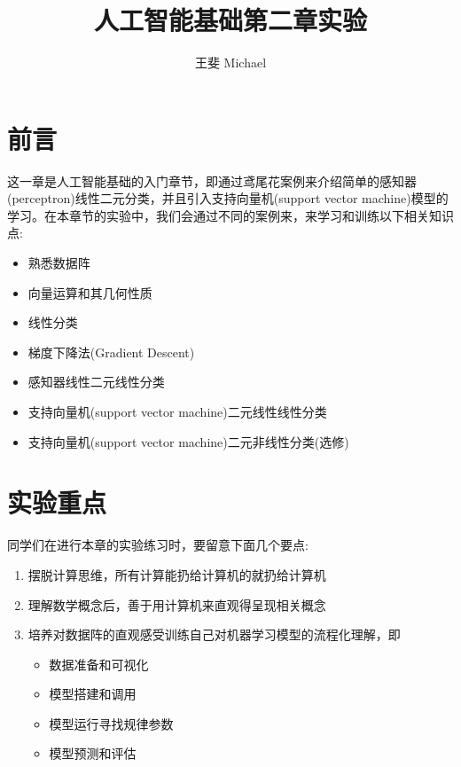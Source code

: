 \documentclass[11pt]{article}
\theoremstyle{definition}
\numberwithin{equation}{section}
\begin{document}


\title{人工智能基础第二章实验}
\author{王斐 Michael}
\date{}

\maketitle

\section*{前言}

这一章是人工智能基础的入门章节，即通过鸢尾花案例来介绍简单的感知器(perceptron)线性二元分类，并且引入支持向量机(support vector machine)模型的学习。在本章节的实验中，我们会通过不同的案例来，来学习和训练以下相关知识点:
\begin{itemize}
	\item 熟悉数据阵
	\item 向量运算和其几何性质
	\item 线性分类
	\item 梯度下降法(Gradient Descent)
	\item 感知器线性二元线性分类
	\item 支持向量机(support vector machine)二元线性线性分类
	\item 支持向量机(support vector machine)二元非线性分类(选修)
\end{itemize}

\section*{实验重点}

同学们在进行本章的实验练习时，要留意下面几个要点:
\begin{enumerate}
	\item 摆脱计算思维，所有计算能扔给计算机的就扔给计算机
	\item 理解数学概念后，善于用计算机来直观得呈现相关概念
	\item 培养对数据阵的直观感受训练自己对机器学习模型的流程化理解，即 \begin{itemize}
		\item 数据准备和可视化
		\item 模型搭建和调用
		\item 模型运行寻找规律参数
		\item 模型预测和评估
	\end{itemize}
\end{enumerate}
\end{document}
